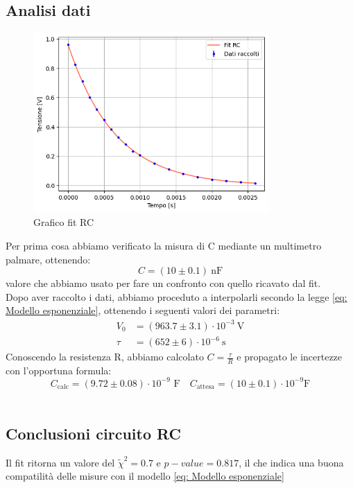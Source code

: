 \documentclass[letterpaper,12pt]{article}
\begin{document}
\subsection{Analisi dati}
\begin{figure}[h]
	\centering
	\includegraphics[width=0.8\textwidth]{RC.png} %
	\caption{Grafico fit RC}
	\label{fig:fitRC}
\end{figure}
Per prima cosa abbiamo verificato la  misura  di C mediante un multimetro palmare, ottenendo: $$ C = (10 \pm 0.1)\ \text{nF}$$  valore che abbiamo usato per fare un confronto con quello ricavato dal fit.\\
Dopo aver raccolto i dati, abbiamo proceduto a interpolarli secondo la legge \eqref{eq: Modello esponenziale}, ottenendo i seguenti valori dei parametri:
\begin{align*}
	V_0  & = (963.7 \pm 3.1)\cdot 10^{-3}\ \text{V} \\
	\tau & = (652 \pm 6) \cdot 10^{-6}\ \text{s}
\end{align*}
Conoscendo la resistenza R, abbiamo calcolato $C = \frac{\tau}{R}$ e propagato le incertezze con l'opportuna formula:
$$ C_\text{calc}= (9.72 \pm 0.08) \cdot 10^{-9} \text{ F} \quad
	C_\text{attesa}= (10 \pm 0.1) \cdot 10^{-9} \text{F}
$$ \\


\subsection{Conclusioni circuito RC}
Il fit ritorna un valore del $\widetilde{\chi}^2 = 0.7$ e $p-value = 0.817$, il che indica una buona compatilità delle misure con il modello \eqref{eq: Modello esponenziale}\\
\end{document}
